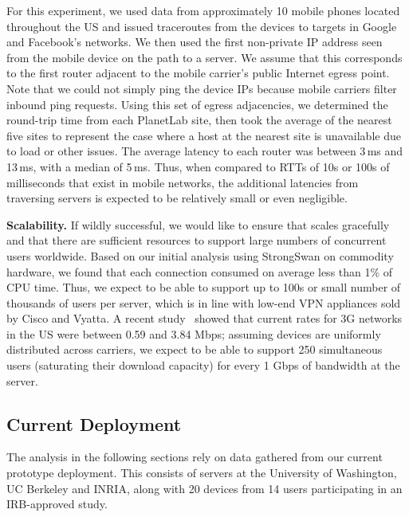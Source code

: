 For this experiment, 
we used data from approximately 10 mobile phones located throughout
the US and issued traceroutes from the devices to targets in Google
and Facebook's networks. We then used the first non-private IP address seen 
from the mobile device on the path to a server. We assume that this corresponds 
to the first router adjacent to the mobile carrier's public Internet egress point. Note that we could not simply ping the device IPs because mobile carriers filter inbound ping requests. Using this set of egress adjacencies, we determined the round-trip time from each PlanetLab site, then took the average of the nearest five sites to represent the case where a host at the nearest site is unavailable due to load or other issues. The average latency to each router was between 3\,ms and 13\,ms, with a median of 5\,ms. Thus, when compared to RTTs of 10s or 100s of milliseconds that exist in mobile networks, the additional latencies from traversing \meddle servers is expected to be relatively small or even negligible.




\noindent\textbf{Scalability.} If wildly successful, we would like to
ensure that \meddle scales gracefully and that there are sufficient
resources to support large numbers of concurrent users
worldwide. Based on our initial analysis using StrongSwan on commodity
hardware, we found that each connection consumed on average less than
1\% of CPU time. Thus, we expect to be able to support up to 100s or
small number of thousands of users per server, which is in line with
low-end VPN appliances sold by Cisco and Vyatta. A recent
study~\cite{pcworld-speedtests} showed that current rates for 3G
networks in the US were between 0.59 and 3.84 Mbps; assuming devices
are uniformly distributed across carriers, we expect to be able to
support 250 simultaneous users (saturating their download capacity)
for every 1 Gbps of bandwidth at the server.

\subsection{Current Deployment}
The analysis in the following sections rely on data gathered from 
our current prototype deployment. This consists of \meddle servers at the University of Washington, 
UC Berkeley and INRIA, along with 20 devices from 14 users participating 
in an IRB-approved study. 

